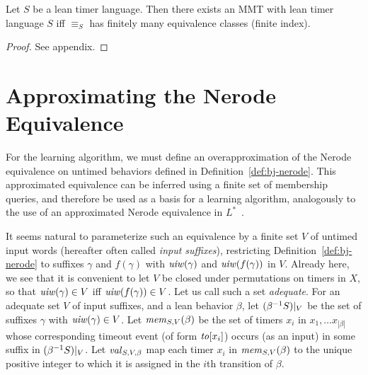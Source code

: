 \begin{theorem}
  \label{thm:bj-nerode}
Let $S$ be a lean timer language.
Then there exists an MMT with lean timer language $S$ iff 
$\equiv_S$ has finitely many equivalence classes (finite index).
\end{theorem}
\ifshort
\begin{proof}
See appendix.
\end{proof}
\else
\fi

\section{Approximating the Nerode Equivalence}
\label{sec:approx}

For the learning algorithm, we must define an overapproximation
of the Nerode equivalence on untimed behaviors
defined in Definition~\ref{def:bj-nerode}. This
approximated equivalence can be inferred using a finite set of membership
queries, and therefore be used as a basis for a learning algorithm,
analogously to the use of an approximated Nerode equivalence in
$L^*$~\cite{Ang87}.

It seems natural to parameterize such an equivalence by
a finite set $V$ of untimed input words (hereafter often
called {\em input suffixes}), restricting Definition~\ref{def:bj-nerode}
to suffixes $\gamma$ and $f(\gamma)$ with
$\mathit{uiw}(\gamma)$ and $\mathit{uiw}(f(\gamma))$ in $V$.
Already here, we see that it is convenient to 
let $V$ be closed under permutations
on timers in $X$, so that $\mathit{uiw}(\gamma) \in V$ iff
$\mathit{uiw}(f(\gamma)) \in V$.
Let us call such a set {\em adequate}.
For an adequate set $V$ of input suffixes, and a lean behavior $\beta$,
let $({\beta}^{-1}{S})|_{V}$ be the set of suffixes $\gamma$
with $\mathit{uiw}(\gamma) \in V$.
Let $\mathit{mem}_{S,V}(\beta)$ be the set of timers $x_i$ in
$x_1 , \ldots x_{|\beta|}$ whose corresponding timeout event
(of form $\mathit{to}[x_i]$) occurs (as an input) in some suffix in
$({\beta}^{-1}{S})|_{V}$.
Let $\mathit{val}_{S,V,\beta}$ map each timer $x_i$ in
$\mathit{mem}_{S,V}(\beta)$ to the unique positive integer to which it
is assigned in the $i$th transition of $\beta$.


